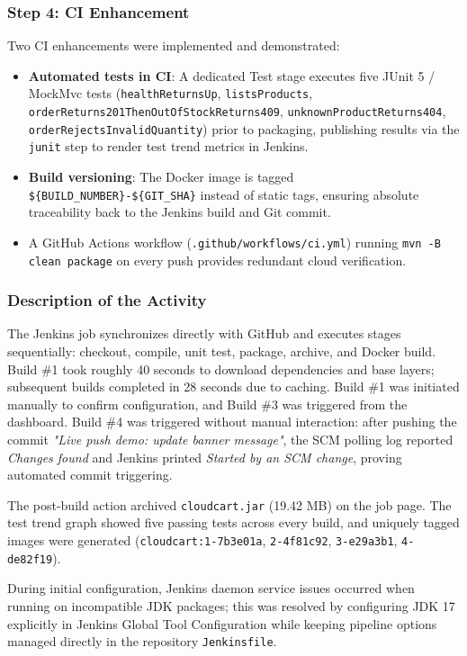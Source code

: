 \documentclass[12pt,a4paper]{article}
\begin{document}
\subsubsection*{Step 4: CI Enhancement}
Two CI enhancements were implemented and demonstrated:
\begin{itemize}[nosep]
    \item \textbf{Automated tests in CI}: A dedicated Test stage executes five JUnit 5 / MockMvc tests (\texttt{healthReturnsUp}, \texttt{listsProducts}, \texttt{orderReturns201ThenOutOfStockReturns409}, \texttt{unknownProductReturns404}, \texttt{orderRejectsInvalidQuantity}) prior to packaging, publishing results via the \texttt{junit} step to render test trend metrics in Jenkins.
    \item \textbf{Build versioning}: The Docker image is tagged \texttt{\$\{BUILD\_NUMBER\}-\$\{GIT\_SHA\}} instead of static tags, ensuring absolute traceability back to the Jenkins build and Git commit.
    \item A GitHub Actions workflow (\texttt{.github/workflows/ci.yml}) running \texttt{mvn -B clean package} on every push provides redundant cloud verification.
\end{itemize}

\subsubsection*{Description of the Activity}
The Jenkins job synchronizes directly with GitHub and executes stages sequentially: checkout, compile, unit test, package, archive, and Docker build. Build \#1 took roughly 40 seconds to download dependencies and base layers; subsequent builds completed in 28 seconds due to caching. Build \#1 was initiated manually to confirm configuration, and Build \#3 was triggered from the dashboard. Build \#4 was triggered without manual interaction: after pushing the commit \textit{"Live push demo: update banner message"}, the SCM polling log reported \textit{Changes found} and Jenkins printed \textit{Started by an SCM change}, proving automated commit triggering.

The post-build action archived \texttt{cloudcart.jar} (19.42 MB) on the job page. The test trend graph showed five passing tests across every build, and uniquely tagged images were generated (\texttt{cloudcart:1-7b3e01a}, \texttt{2-4f81c92}, \texttt{3-e29a3b1}, \texttt{4-de82f19}).

During initial configuration, Jenkins daemon service issues occurred when running on incompatible JDK packages; this was resolved by configuring JDK 17 explicitly in Jenkins Global Tool Configuration while keeping pipeline options managed directly in the repository \texttt{Jenkinsfile}.
\end{document}
